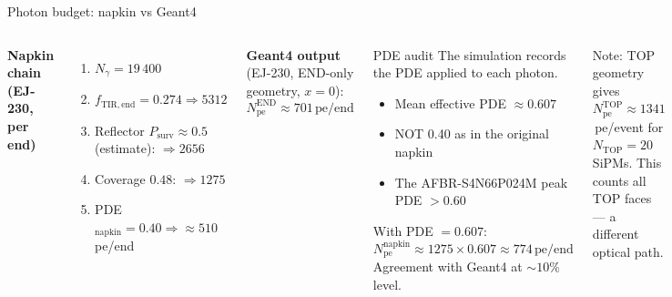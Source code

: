 \documentclass[aspectratio=169,9pt]{beamer}
\newcommand{\NTOP}{N_{\mathrm{TOP}}}
\begin{document}
\begin{frame}{Photon budget: napkin vs Geant4}
\begin{columns}[T]
\textbf{Napkin chain (EJ-230, per end)}
\begin{enumerate}
  \item $N_\gamma = 19\,400$
  \item $f_{\mathrm{TIR,end}} = 0.274 \Rightarrow 5312$
  \item Reflector $P_{\mathrm{surv}} \approx 0.5$ (estimate): $\Rightarrow 2656$
  \item Coverage $0.48$: $\Rightarrow 1275$
  \item PDE$_{\mathrm{napkin}}=0.40 \Rightarrow \approx 510$\,pe/end
\end{enumerate}

\vspace{4pt}
\textbf{Geant4 output} (EJ-230, END-only geometry, $x=0$):
\[
  N_{\mathrm{pe}}^{\mathrm{END}} \approx 701\,\mathrm{pe/end}
\]

\begin{alertblock}{PDE audit}
The simulation records the PDE applied to each photon.
\begin{itemize}
  \item Mean effective PDE $\approx \mathbf{0.607}$
  \item NOT 0.40 as in the original napkin
  \item The AFBR-S4N66P024M peak PDE $> 0.60$
\end{itemize}
With PDE $= 0.607$:
\[
  N_{\mathrm{pe}}^{\mathrm{napkin}} \approx 1275 \times 0.607 \approx 774\,\mathrm{pe/end}
\]
Agreement with Geant4 at $\sim\!10\%$ level.
\end{alertblock}

\vspace{4pt}
{\footnotesize Note: TOP geometry gives $N_{\mathrm{pe}}^{\mathrm{TOP}} \approx 1341$\,pe/event for $\NTOP = 20$ SiPMs.
This counts all TOP faces — a different optical path.}
\end{columns}
\end{frame}
\end{document}
